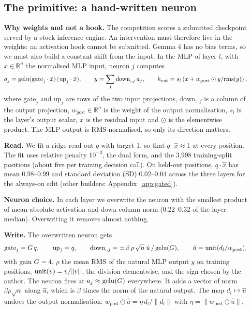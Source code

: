 \subsection{The primitive: a hand-written neuron}
\label{sec:primitive}
\textbf{Why weights and not a hook.} The competition scores a submitted checkpoint served by a stock inference engine. An intervention must therefore live in the weights; an activation hook cannot be submitted. Gemma 4 has no bias terms, so we must also build a constant shift from the input. In the MLP of layer $l$, with $\hat{x} \in \mathbb{R}^n$ the normalised MLP input, neuron $j$ computes
\begin{equation}
\label{eq:neuron}
    a_j = \mathrm{gelu}(\mathrm{gate}_j \cdot \hat{x}) \, (\mathrm{up}_j \cdot \hat{x}), \qquad y = \sum_j \mathrm{down}_{:,j} \, a_j, \qquad h_{\mathrm{out}} = s_l \left( x + w_{\mathrm{post}} \odot y / \mathrm{rms}(y) \right),
\end{equation}
where $\mathrm{gate}_j$ and $\mathrm{up}_j$ are rows of the two input projections, $\mathrm{down}_{:,j}$ is a column of the output projection, $w_{\mathrm{post}} \in \mathbb{R}^n$ is the weight of the output normalisation, $s_l$ is the layer's output scalar, $x$ is the residual input and $\odot$ is the elementwise product. The MLP output is RMS-normalised, so only its direction matters.

\textbf{Read.} We fit a ridge read-out $q$ with target 1, so that $q \cdot \hat{x} \approx 1$ at every position. The fit uses relative penalty $10^{-3}$, the dual form, and the 3,998 training-split positions (about five per training decision call). On held-out positions, $q \cdot \hat{x}$ has mean 0.98--0.99 and standard deviation (SD) 0.02--0.04 across the three layers for the always-on edit (other builders: Appendix~\ref{app:gated}).

\textbf{Neuron choice.} In each layer we overwrite the neuron with the smallest product of mean absolute activation and down-column norm (0.22--0.32 of the layer median). Overwriting it removes almost nothing.

\textbf{Write.} The overwritten neuron gets
\begin{equation}
\label{eq:write}
    \mathrm{gate}_j = G\, q, \qquad \mathrm{up}_j = q, \qquad \mathrm{down}_{:,j} = \pm\,\beta \, \rho \, \sqrt{n} \; \hat{u} \, / \, \mathrm{gelu}(G), \qquad \hat{u} = \mathrm{unit}(d_l / w_{\mathrm{post}}),
\end{equation}
with gain $G = 4$, $\rho$ the mean RMS of the natural MLP output $y$ on training positions, $\mathrm{unit}(v) = v / \lVert v \rVert$, the division elementwise, and the sign chosen by the author. The neuron fires at $a_j \approx \mathrm{gelu}(G)$ everywhere. It adds a vector of norm $\beta \rho \sqrt{n}$ along $\hat{u}$, which is $\beta$ times the norm of the natural output. The map $d_l \mapsto \hat{u}$ undoes the output normalisation: $w_{\mathrm{post}} \odot \hat{u} = \eta\, d_l / \lVert d_l \rVert$ with $\eta = \lVert w_{\mathrm{post}} \odot \hat{u} \rVert$.

